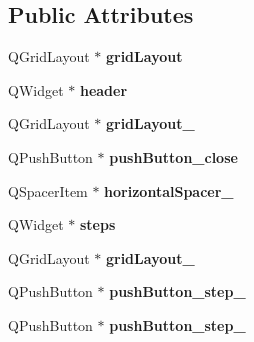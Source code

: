 \subsection*{Public Attributes}
\begin{DoxyCompactItemize}
\item 
Q\+Grid\+Layout $\ast$ {\bfseries grid\+Layout}\hypertarget{class_ui___navar_q_t_class_ac917b56bee44b4f2dcbcea7c9b870a1e}{}\label{class_ui___navar_q_t_class_ac917b56bee44b4f2dcbcea7c9b870a1e}

\item 
Q\+Widget $\ast$ {\bfseries header}\hypertarget{class_ui___navar_q_t_class_aa70fb543a044c18cc933ad44e91eb3d1}{}\label{class_ui___navar_q_t_class_aa70fb543a044c18cc933ad44e91eb3d1}

\item 
Q\+Grid\+Layout $\ast$ {\bfseries grid\+Layout\+\_}\hypertarget{class_ui___navar_q_t_class_a4e3846b2a2765c4473d084a273885a0d}{}\label{class_ui___navar_q_t_class_a4e3846b2a2765c4473d084a273885a0d}

\item 
Q\+Push\+Button $\ast$ {\bfseries push\+Button\+\_\+close}\hypertarget{class_ui___navar_q_t_class_a4fb956f52699ecde743c460bb7cbad85}{}\label{class_ui___navar_q_t_class_a4fb956f52699ecde743c460bb7cbad85}

\item 
Q\+Spacer\+Item $\ast$ {\bfseries horizontal\+Spacer\+\_}\hypertarget{class_ui___navar_q_t_class_a82b1a287b77babbed5bf34fcb0c59de2}{}\label{class_ui___navar_q_t_class_a82b1a287b77babbed5bf34fcb0c59de2}

\item 
Q\+Widget $\ast$ {\bfseries steps}\hypertarget{class_ui___navar_q_t_class_ad89479d3173a7f10b7cbb6aa6f58a06b}{}\label{class_ui___navar_q_t_class_ad89479d3173a7f10b7cbb6aa6f58a06b}

\item 
Q\+Grid\+Layout $\ast$ {\bfseries grid\+Layout\+\_}\hypertarget{class_ui___navar_q_t_class_a63936277b77492ee8892019961c7f407}{}\label{class_ui___navar_q_t_class_a63936277b77492ee8892019961c7f407}

\item 
Q\+Push\+Button $\ast$ {\bfseries push\+Button\+\_\+step\+\_}\hypertarget{class_ui___navar_q_t_class_a084cfe909f021bbb02f5bb6d510b0d7c}{}\label{class_ui___navar_q_t_class_a084cfe909f021bbb02f5bb6d510b0d7c}

\item 
Q\+Push\+Button $\ast$ {\bfseries push\+Button\+\_\+step\+\_}\hypertarget{class_ui___navar_q_t_class_aaef76d2aa833be3664d30d6dc565f637}{}\label{class_ui___navar_q_t_class_aaef76d2aa833be3664d30d6dc565f637}


\end{DoxyCompactItemize}
